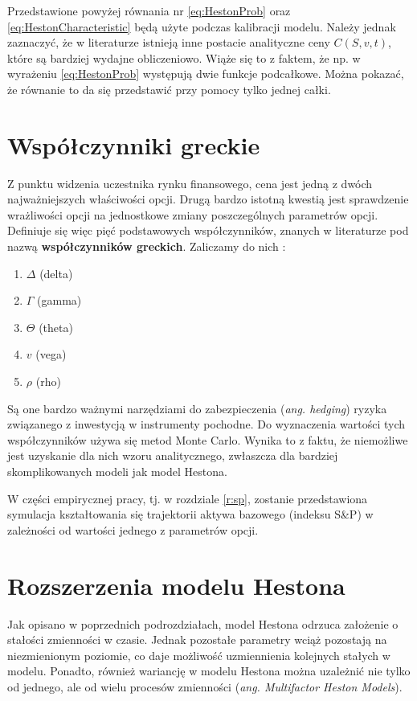 \documentclass{pracamgr}
\begin{document}
Przedstawione powyżej równania nr \ref{eq:HestonProb} oraz 
\ref{eq:HestonCharacteristic} będą użyte podczas kalibracji modelu. Należy jednak zaznaczyć, że 
w literaturze istnieją inne postacie analityczne ceny $C(S, v, t)$, które są bardziej wydajne obliczeniowo. 
Wiąże się to z faktem, że np. w wyrażeniu \ref{eq:HestonProb} występują dwie funkcje podcałkowe. 
Można pokazać, że równanie to da się przedstawić przy pomocy tylko jednej całki.

\section{Współczynniki greckie}

Z punktu widzenia uczestnika rynku finansowego, cena jest jedną z dwóch najważniejszych 
właściwości opcji. Drugą bardzo istotną kwestią jest sprawdzenie wrażliwości opcji na jednostkowe zmiany
poszczególnych parametrów opcji.
Definiuje się więc pięć podstawowych współczynników, znanych w literaturze pod nazwą \textbf{współczynników greckich}.
Zaliczamy do nich \cite{Hull}:
\begin{enumerate}
  \item $\Delta$ (delta)
  \item $\Gamma$ (gamma)
  \item $\Theta$ (theta)
  \item $v$ (vega)
  \item $\rho$ (rho)
\end{enumerate}
Są one bardzo ważnymi narzędziami do zabezpieczenia (\textit{ang. hedging}) ryzyka 
związanego z inwestycją w instrumenty pochodne.
Do wyznaczenia wartości tych współczynników używa się metod Monte Carlo. Wynika to z faktu, 
że niemożliwe jest uzyskanie dla nich wzoru analitycznego, 
zwłaszcza dla bardziej skomplikowanych modeli jak model Hestona.

W części empirycznej pracy, tj. w rozdziale \ref{r:sp}, zostanie przedstawiona symulacja kształtowania się trajektorii aktywa bazowego (indeksu S\&P) w zależności od wartości jednego z parametrów opcji.

\section{Rozszerzenia modelu Hestona}

Jak opisano w poprzednich podrozdziałach, model Hestona odrzuca założenie o stałości zmienności w czasie. 
Jednak pozostałe parametry wciąż pozostają na niezmienionym poziomie, co daje możliwość uzmiennienia
kolejnych stałych w modelu.
Ponadto, również wariancję w modelu Hestona można uzależnić nie tylko 
od jednego, ale od wielu procesów zmienności (\textit{ang. Multifactor Heston Models}).
\end{document}
